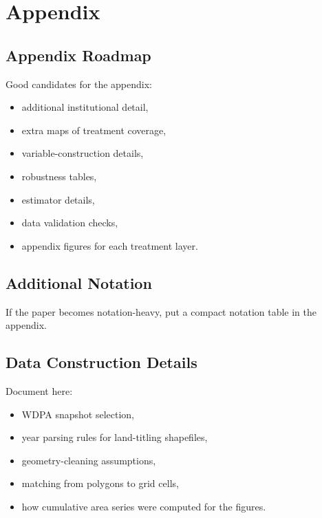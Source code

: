 \section{Appendix}

\subsection{Appendix Roadmap}

Good candidates for the appendix:

\begin{itemize}
    \item additional institutional detail,
    \item extra maps of treatment coverage,
    \item variable-construction details,
    \item robustness tables,
    \item estimator details,
    \item data validation checks,
    \item appendix figures for each treatment layer.
\end{itemize}

\subsection{Additional Notation}

If the paper becomes notation-heavy, put a compact notation table in the appendix.

\subsection{Data Construction Details}

Document here:

\begin{itemize}
    \item WDPA snapshot selection,
    \item year parsing rules for land-titling shapefiles,
    \item geometry-cleaning assumptions,
    \item matching from polygons to grid cells,
    \item how cumulative area series were computed for the figures.
\end{itemize}
